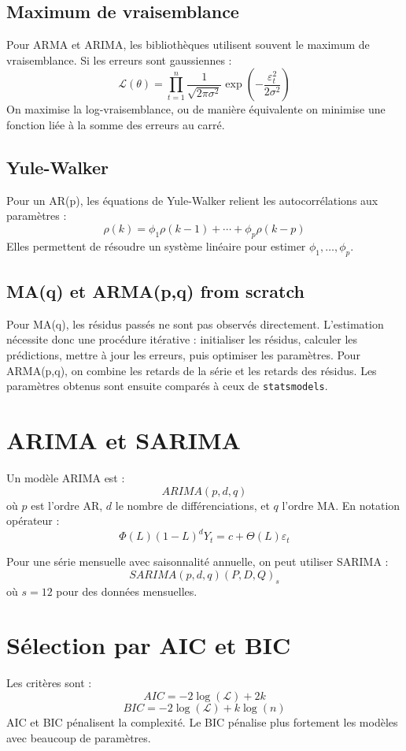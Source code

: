 \documentclass[12pt,a4paper]{report}
\begin{document}
\subsection{Maximum de vraisemblance}
Pour ARMA et ARIMA, les bibliothèques utilisent souvent le maximum de vraisemblance. Si les erreurs sont gaussiennes :
\[
\mathcal{L}(\theta) = \prod_{t=1}^n \frac{1}{\sqrt{2\pi\sigma^2}}\exp\left(-\frac{\varepsilon_t^2}{2\sigma^2}\right)
\]
On maximise la log-vraisemblance, ou de manière équivalente on minimise une fonction liée à la somme des erreurs au carré.

\subsection{Yule-Walker}
Pour un AR(p), les équations de Yule-Walker relient les autocorrélations aux paramètres :
\[
\rho(k) = \phi_1\rho(k-1)+\cdots+\phi_p\rho(k-p)
\]
Elles permettent de résoudre un système linéaire pour estimer $\phi_1, \ldots, \phi_p$.

\subsection{MA(q) et ARMA(p,q) from scratch}
Pour MA(q), les résidus passés ne sont pas observés directement. L'estimation nécessite donc une procédure itérative : initialiser les résidus, calculer les prédictions, mettre à jour les erreurs, puis optimiser les paramètres. Pour ARMA(p,q), on combine les retards de la série et les retards des résidus. Les paramètres obtenus sont ensuite comparés à ceux de \texttt{statsmodels}.

\section{ARIMA et SARIMA}
Un modèle ARIMA est :
\[
ARIMA(p,d,q)
\]
où $p$ est l'ordre AR, $d$ le nombre de différenciations, et $q$ l'ordre MA. En notation opérateur :
\[
\Phi(L)(1-L)^dY_t = c + \Theta(L)\varepsilon_t
\]

Pour une série mensuelle avec saisonnalité annuelle, on peut utiliser SARIMA :
\[
SARIMA(p,d,q)(P,D,Q)_s
\]
où $s=12$ pour des données mensuelles.

\section{Sélection par AIC et BIC}
Les critères sont :
\[
AIC = -2\log(\mathcal{L}) + 2k
\]
\[
BIC = -2\log(\mathcal{L}) + k\log(n)
\]
AIC et BIC pénalisent la complexité. Le BIC pénalise plus fortement les modèles avec beaucoup de paramètres.
\end{document}
